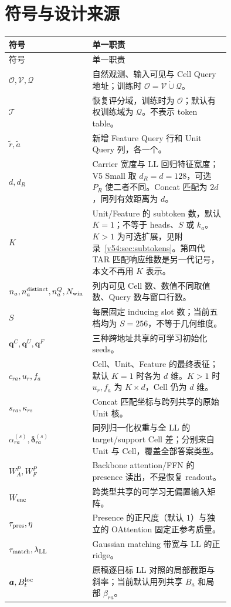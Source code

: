 \documentclass[11pt,UTF8,fontset=fandol]{ctexart}
\numberwithin{equation}{section}
\renewcommand{\arraystretch}{1.14}
\theoremstyle{definition}
\newcommand{\Oset}{\mathcal O}
\newcommand{\Vset}{\mathcal V}
\newcommand{\Qset}{\mathcal Q}
\newcommand{\TargetSet}{\mathcal T}
\newcommand{\Fstar}{\widetilde r}
\newcommand{\Ustar}{\widetilde a}
\begin{document}
\section{符号与设计来源}
\label{sec:symbols}
\begingroup\small\renewcommand{\arraystretch}{1.06}
\begin{longtable}{l p{0.75\linewidth}}
\toprule
符号 & 单一职责\\
\midrule
\endfirsthead
\toprule 符号 & 单一职责\\\midrule
\endhead
$\Oset,\Vset,\Qset$ & 自然观测、输入可见与 Cell Query 地址；训练时 $\Oset=\Vset\dot\cup\Qset$。\\
$\TargetSet$ & 恢复评分域，训练时为 $\Oset$；默认有权训练域为 $\Qset$。不表示 token table。\\
$\Fstar,\Ustar$ & 新增 Feature Query 行和 Unit Query 列，各一个。\\
$d,d_R$ & Carrier 宽度与 LL 回归特征宽度；V5 Small 取 $d_R=d=128$，可选 $P_R$ 使二者不同。Concat 匹配为 $2d$，同列有效距离为 $d$。\\
$K$ & Unit/Feature 的 subtoken 数，默认 $K=1$；不等于 heads、$S$ 或 $k_a$。$K>1$ 为可选扩展，见附录~\ref{v54:sec:subtokens}。第四代 TAR 匹配响应维数是另一代记号，本文不再用 $K$ 表示。\\
$n_a,n_a^{\rm distinct},n_a^{Q},N_{\rm win}$ & 列内可见 Cell 数、数值不同取值数、Query 数与窗口行数。\\
$S$ & 每层固定 inducing slot 数；当前五档均为 $S=256$，不等于几何维度。\\
$\bm q^C,\bm q^U,\bm q^F$ & 三种跨地址共享的可学习初始化 seeds。\\
$c_{ra},u_r,f_a$ & Cell、Unit、Feature 的最终表征；默认 $K=1$ 时各为 $d$ 维。$K>1$ 时 $u_r,f_a$ 为 $K\times d$，Cell 仍为 $d$ 维。\\
$s_{ra},\kappa_{rs}$ & Concat 匹配坐标与跨列共享的原始 Unit 核。\\
$\alpha_{ra}^{(s)},\bm\delta_{ra}^{(s)}$ & 同列归一化权重与全 LL 的 target/support Cell 差；分别来自 Unit 与 Cell，覆盖全部答案类型。\\
$W_A^P,W_F^P$ & Backbone attention/FFN 的 presence 读出，不是恢复 readout。\\
$W_{\rm enc}$ & 跨类型共享的可学习无偏置输入矩阵。\\
$\tau_{\rm pres},\eta$ & Presence 的正尺度（默认 $1$）与独立的 OAttention 固定正参考质量。\\
$\tau_{\rm match},\lambda_{\rm LL}$ & Gaussian matching 带宽与 LL 的正 ridge。\\
$\bm a,B_t^{\rm loc}$ & 原稿逐目标 LL 对照的局部截距与斜率；当前默认用列共享 $B_a$ 和局部 $\beta_{ra}$。\\

\end{longtable}
\end{document}
